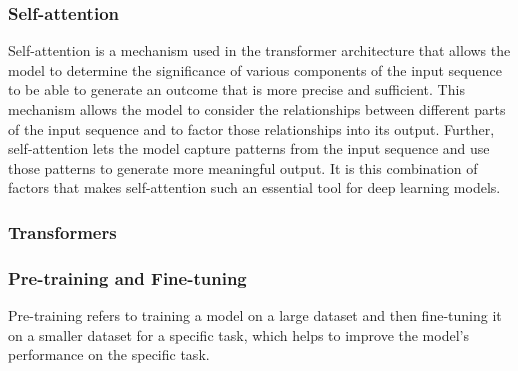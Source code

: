 


\subsubsection{Self-attention}

Self-attention \cite{https://doi.org/10.48550/arxiv.1706.03762} is a mechanism used in the transformer architecture that allows the model to determine the significance of various components of the input sequence to be able to generate an outcome that is more precise and sufficient. This mechanism allows the model to consider the relationships between different parts of the input sequence and to factor those relationships into its output. Further, self-attention lets the model capture patterns from the input sequence and use those patterns to generate more meaningful output. It is this combination of factors that makes self-attention such an essential tool for deep learning models.
\subsubsection{Transformers}



\subsubsection{Pre-training and Fine-tuning}

Pre-training refers to training a model on a large dataset and then fine-tuning it on a smaller dataset for a specific task, which helps to improve the model's performance on the specific task.

